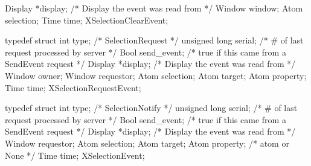 \documentclass{report}
\begin{document}
\begin{itemize}
\begin{cppcode}
{                    Display *display;           /* Display the event was read from */
                    Window window;
                    Atom selection;
                    Time time;
                } XSelectionClearEvent; 
            \end{cppcode}
            \begin{cppcode}
                typedef struct {
                    int type;                   /* SelectionRequest */
                    unsigned long serial;       /* # of last request processed by server */
                    Bool send_event;            /* true if this came from a SendEvent request */
                    Display *display;           /* Display the event was read from */
                    Window owner;
                    Window requestor;
                    Atom selection;
                    Atom target;
                    Atom property;
                    Time time;
                } XSelectionRequestEvent;
            \end{cppcode}
            \begin{cppcode}
                typedef struct {
                    int type;               /* SelectionNotify */
                    unsigned long serial;   /* # of last request processed by server */
                    Bool send_event;        /* true if this came from a SendEvent request */
                    Display *display;       /* Display the event was read from */
                    Window requestor;
                    Atom selection;
                    Atom target;
                    Atom property;          /* atom or None */
                    Time time;
                } XSelectionEvent;
            \end{cppcode}
    \end{itemize}

    \pagebreak 
\end{document}
